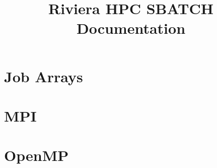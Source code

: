 \documentclass[11pt,letterpaper]{article}
\title{Riviera HPC SBATCH Documentation}
\begin{document}
\startdoc

\section{Job Arrays}


\section{MPI}


\section{OpenMP}

\end{document}

